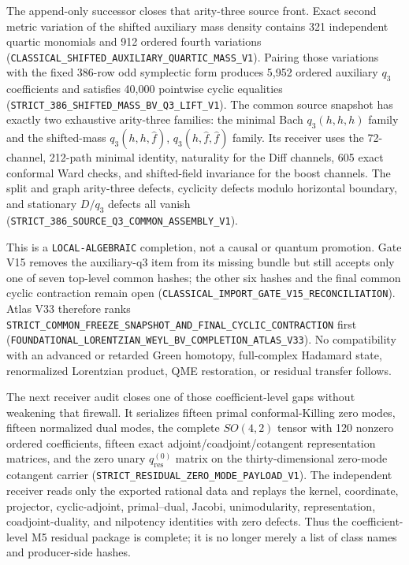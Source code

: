 \documentclass[11pt]{article}
\theoremstyle{definition}
\theoremstyle{remark}
\newcommand{\cert}[1]{\nolinkurl{#1}}
\newcommand{\rtype}[1]{\nolinkurl{#1}}
\begin{document}
The append-only successor closes that arity-three source front.  Exact second
metric variation of the shifted auxiliary mass density contains 321
independent quartic monomials and 912 ordered fourth variations
(\cert{CLASSICAL_SHIFTED_AUXILIARY_QUARTIC_MASS_V1}).  Pairing those variations
with the fixed 386-row odd symplectic form produces 5,952 ordered auxiliary
\(q_3\) coefficients and satisfies 40,000 pointwise cyclic equalities
(\cert{STRICT_386_SHIFTED_MASS_BV_Q3_LIFT_V1}).  The common source snapshot has
exactly two exhaustive arity-three families: the minimal Bach
\(q_3(h,h,h)\) family and the shifted-mass
\(q_3(h,h,\widehat f)\), \(q_3(h,\widehat f,\widehat f)\) family.  Its receiver
uses the 72-channel, 212-path minimal identity, naturality for the Diff
channels, 605 exact conformal Ward checks, and shifted-field invariance for the
boost channels.  The split and graph arity-three defects, cyclicity defects
modulo horizontal boundary, and stationary \(D/q_3\) defects all vanish
(\cert{STRICT_386_SOURCE_Q3_COMMON_ASSEMBLY_V1}).

This is a \rtype{LOCAL-ALGEBRAIC} completion, not a causal or quantum
promotion.  Gate V15 removes the auxiliary-q3 item from its missing bundle but
still accepts only one of seven top-level common hashes; the other six hashes
and the final common cyclic contraction remain open
(\cert{CLASSICAL_IMPORT_GATE_V15_RECONCILIATION}).  Atlas V33 therefore ranks
\cert{STRICT_COMMON_FREEZE_SNAPSHOT_AND_FINAL_CYCLIC_CONTRACTION} first
(\cert{FOUNDATIONAL_LORENTZIAN_WEYL_BV_COMPLETION_ATLAS_V33}).  No compatibility
with an advanced or retarded Green homotopy, full-complex Hadamard state,
renormalized Lorentzian product, QME restoration, or residual transfer follows.

The next receiver audit closes one of those coefficient-level gaps without
weakening that firewall.  It serializes fifteen primal conformal-Killing
zero modes, fifteen normalized dual modes, the complete \(SO(4,2)\) tensor
with 120 nonzero ordered coefficients, fifteen exact
adjoint/coadjoint/cotangent representation matrices, and the zero unary
\(q_{\mathrm{res}}^{(0)}\) matrix on the thirty-dimensional zero-mode
cotangent carrier
(\cert{STRICT_RESIDUAL_ZERO_MODE_PAYLOAD_V1}).  The independent receiver reads
only the exported rational data and replays the kernel, coordinate, projector,
cyclic-adjoint, primal--dual, Jacobi, unimodularity, representation,
coadjoint-duality, and nilpotency identities with zero defects.  Thus the
coefficient-level M5 residual package is complete; it is no longer merely a
list of class names and producer-side hashes.
\end{document}
